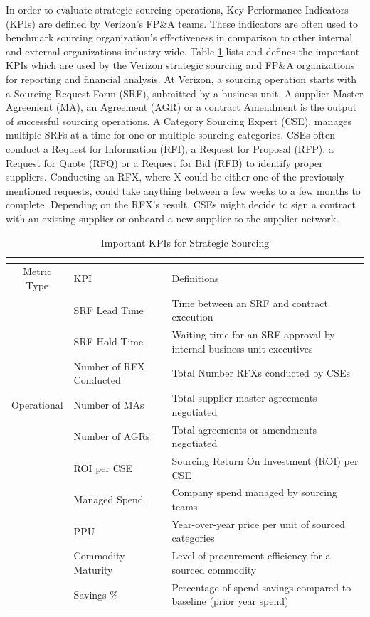 \documentclass[inte,nonblindrev]{informs3} %
\begin{document}
In order to evaluate strategic sourcing operations, Key Performance Indicators (KPIs) are defined by Verizon's FP\&A teams. These indicators are often used to benchmark sourcing organization's effectiveness in comparison to other internal and external organizations industry wide. Table \ref{tabel:tbl1} lists and defines the important KPIs which are used by the Verizon strategic sourcing and FP\&A organizations for reporting and financial analysis. At Verizon, a sourcing operation starts with a Sourcing Request Form (SRF), submitted by a business unit. A supplier Master Agreement (MA), an Agreement (AGR) or a contract Amendment is the output of successful sourcing operations. A Category Sourcing Expert (CSE), manages multiple SRFs at a time for one or multiple sourcing categories. CSEs often conduct a Request for Information (RFI), a Request for Proposal (RFP), a Request for Quote (RFQ) or a Request for Bid (RFB) to identify proper suppliers. Conducting an RFX, where X could be either one of the previously mentioned requests, could take anything between a few weeks to a few months to complete. Depending on the RFX's result, CSEs might decide to sign a contract with an existing supplier or onboard a new supplier to the supplier network.

\begin{table}
	\begin{tabular}
		{c | >{\centering\arraybackslash}m{3.5 cm} | >{\centering\arraybackslash}m{10 cm}}
			\multicolumn{3}{c}{} \\
			\hline
			Metric Type & KPI & Definitions \\ 
			\hline
			\multirow{7}{*}{Operational} 
				& SRF Lead Time & Time between an SRF and contract execution \\
				& SRF Hold Time & Waiting time for an SRF approval by internal business unit executives\\ 		
				& Number of RFX Conducted & Total Number RFXs conducted by CSEs \\		
 				& Number of MAs & Total supplier master agreements negotiated \\
 				& Number of AGRs & Total agreements or amendments negotiated \\
 				\hline
			\multirow{8}{*}{Financial} 
				& ROI per CSE & Sourcing Return On Investment (ROI) per CSE\\
 				& Managed Spend & Company spend managed by sourcing teams \\
 				& PPU & Year-over-year price per unit of sourced categories \\ 
 				& Commodity Maturity & Level of procurement efficiency for a sourced commodity \\
 				& Savings \% & Percentage of spend savings compared to baseline (prior year spend) \\
			\hline
	\end{tabular}
	\caption{Important KPIs for Strategic Sourcing}
	\label{tabel:tbl1}
\end{table}
\end{document}
